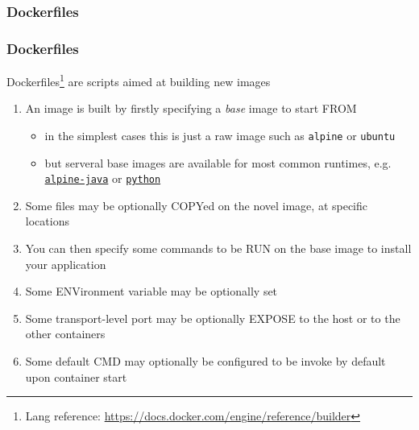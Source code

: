\documentclass[handout]{beamer}\mode<presentation>{\usetheme{AMSCesenaBleu}}
\begin{document}
\begin{frame}[allowframebreaks]
\begin{enumerate}
    \end{enumerate}

\end{frame}

\subsubsection{Dockerfiles}

\begin{frame}%
\frametitle{Dockerfiles}

    Dockerfiles\footnote{Lang reference: \url{https://docs.docker.com/engine/reference/builder}} are scripts aimed at \alert{building} new images
    \begin{enumerate}
        \item An image is built by firstly specifying a \emph{base} image to start \alert{FROM}
        \begin{itemize}
            \item in the simplest cases this is just a raw image such as \texttt{alpine} or \texttt{ubuntu}
            \item but serveral base images are available for most common runtimes, e.g. \href{https://hub.docker.com/r/anapsix/alpine-java/}{\texttt{alpine-java}} or \href{https://hub.docker.com/_/python/}{\texttt{python}}
        \end{itemize}
        \item Some files may be optionally \alert{COPY}ed on the novel image, at specific locations
        \item You can then specify some commands to be \alert{RUN} on the base image to install your application
        \item Some \alert{ENV}ironment variable may be optionally set
        \item Some transport-level port may be optionally \alert{EXPOSE} to the host or to the other containers
        \item Some default \alert{CMD} may optionally be configured to be invoke by default upon container start
         
    \end{enumerate}
    
\end{frame}
\end{document}

